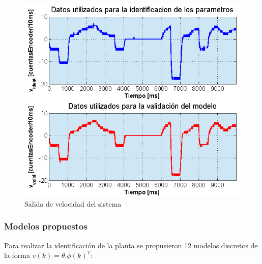 \begin{figure}[!ht]
	\centering
	\includegraphics[width=15cm,scale=1]{resources/3_17-respuestaIdentPlanta.png}
	\caption{Salida de velocidad del sistema}
	\label{fig:\thefigure}
\end{figure}

\subsubsection{Modelos propuestos}
Para realizar la identificación de la planta se propusieron 12 modelos discretos de la forma \(v(k) = \theta . \phi(k)^T \):

